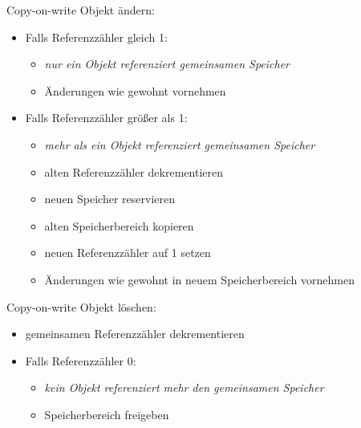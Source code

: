 \documentclass{beamer}
\begin{document}
\begin{frame}{Copy-on-write}
  Objekt ändern:
    \begin{itemize}
      \item Falls Referenzzähler gleich 1:
        \begin{itemize}
          \item \emph{nur ein Objekt referenziert gemeinsamen Speicher}
          \item Änderungen wie gewohnt vornehmen
        \end{itemize}
      \item Falls Referenzzähler größer als 1:
        \begin{itemize}
          \item \emph{mehr als ein Objekt referenziert gemeinsamen Speicher}
          \item alten Referenzzähler dekrementieren
          \item neuen Speicher reservieren
          \item alten Speicherbereich kopieren
          \item neuen Referenzzähler auf 1 setzen
          \item Änderungen wie gewohnt in neuem Speicherbereich vornehmen
        \end{itemize}
    \end{itemize}
\end{frame}

\begin{frame}{Copy-on-write}
  Objekt löschen:
    \begin{itemize}
      \item gemeinsamen Referenzzähler dekrementieren
      \item Falls Referenzzähler 0:
        \begin{itemize}
          \item \emph{kein Objekt referenziert mehr den gemeinsamen Speicher}
          \item Speicherbereich freigeben
        \end{itemize}
    \end{itemize}
\end{frame}
\end{document}
